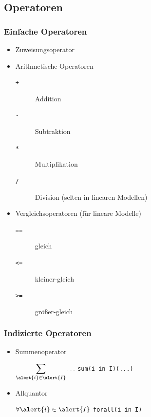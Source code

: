 \subsection{Operatoren}
\begin{frame}
 \frametitle{Einfache Operatoren}
 \begin{itemize}
  \item Zuweisungsoperator \structure{\texttt{=}}
  \item Arithmetische Operatoren
  \begin{description}
   \item[\texttt{+}] Addition
   \item[\texttt{-}] Subtraktion
   \item[\texttt{*}] Multiplikation
   \item[\texttt{/}] Division (selten in linearen Modellen)
  \end{description}
  \item Vergleichsoperatoren (für lineare Modelle)
  \begin{description}
   \item[\texttt{==}] gleich
   \item[\texttt{<=}] kleiner-gleich
   \item[\texttt{>=}] größer-gleich
  \end{description}
 \end{itemize}
\end{frame}

\begin{frame}
 \frametitle{Indizierte Operatoren}
 \begin{itemize}
  \item Summenoperator
  \begin{flushleft}\Large
   {$\displaystyle\sum_{\alert{i}\in \alert{I}}\ldots$} 
   \textrightarrow{} 
   { \texttt{sum(\alert{i} in \alert{I})(\textsf{...})}}
  \end{flushleft}
  \medskip
  \item Allquantor
  \begin{flushleft}\Large
   {$\displaystyle\forall {\alert{i}\in \alert{I}}$} 
   \textrightarrow{} 
   { \texttt{forall(\alert{i} in \alert{I})}}
  \end{flushleft}
 \end{itemize}

\end{frame}


